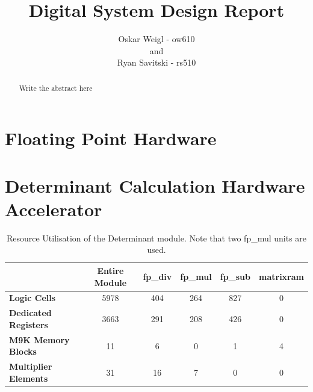 \documentclass[]{article}
\title{Digital System Design Report}
\author{Oskar Weigl - ow610\\ and \\ Ryan Savitski - rs510}
\begin{document}
\maketitle

\begin{abstract}
	Write the abstract here
\end{abstract}

\tableofcontents
\clearpage

\section{Floating Point Hardware} %
\label{sec:floating_point_hardware}


\section{Determinant Calculation Hardware Accelerator} %
\label{sec:determinant_calculation_hardware_accelerator}

\begin{table}[htbp]
	\caption{Resource Utilisation of the Determinant module. Note that two fp\_mul units are used.}
	\label{tab:resource_util_det}
	\begin{center}
		\begin{tabular}{l|ccccc}
		\hline

		\hline
											& \textbf{Entire Module} 	& \textbf{fp\_div} 		& \textbf{fp\_mul}	& \textbf{fp\_sub} 	& \textbf{matrixram} \\
		\hline
			\textbf{Logic Cells} 			& 5978						& 404 					& 264 				& 827 				& 0 \\
		\hline
			\textbf{Dedicated Registers}	& 3663						& 291 					& 208 				& 426				& 0 \\
		\hline
			\textbf{M9K Memory Blocks}		& 11						& 6 					& 0 				& 1 				& 4 \\
		\hline
			\textbf{Multiplier Elements}	& 31						& 16 					& 7 				& 0					& 0 \\
		\hline

		\hline
		\end{tabular}
	\end{center}
\end{table}
\end{document}
